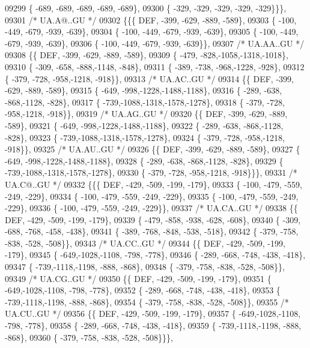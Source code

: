 \begin{DoxyCode}
09299 \{ -689, -689, -689, -689, -689\},
09300 \{ -329, -329, -329, -329, -329\}\}\},
09301 \textcolor{comment}{/* UA.A@..GU */}
09302 \{\{\{  DEF, -399, -629, -889, -589\},
09303 \{ -100, -449, -679, -939, -639\},
09304 \{ -100, -449, -679, -939, -639\},
09305 \{ -100, -449, -679, -939, -639\},
09306 \{ -100, -449, -679, -939, -639\}\},
09307 \textcolor{comment}{/* UA.AA..GU */}
09308 \{\{  DEF, -399, -629, -889, -589\},
09309 \{ -479, -828,-1058,-1318,-1018\},
09310 \{ -309, -658, -888,-1148, -848\},
09311 \{ -389, -738, -968,-1228, -928\},
09312 \{ -379, -728, -958,-1218, -918\}\},
09313 \textcolor{comment}{/* UA.AC..GU */}
09314 \{\{  DEF, -399, -629, -889, -589\},
09315 \{ -649, -998,-1228,-1488,-1188\},
09316 \{ -289, -638, -868,-1128, -828\},
09317 \{ -739,-1088,-1318,-1578,-1278\},
09318 \{ -379, -728, -958,-1218, -918\}\},
09319 \textcolor{comment}{/* UA.AG..GU */}
09320 \{\{  DEF, -399, -629, -889, -589\},
09321 \{ -649, -998,-1228,-1488,-1188\},
09322 \{ -289, -638, -868,-1128, -828\},
09323 \{ -739,-1088,-1318,-1578,-1278\},
09324 \{ -379, -728, -958,-1218, -918\}\},
09325 \textcolor{comment}{/* UA.AU..GU */}
09326 \{\{  DEF, -399, -629, -889, -589\},
09327 \{ -649, -998,-1228,-1488,-1188\},
09328 \{ -289, -638, -868,-1128, -828\},
09329 \{ -739,-1088,-1318,-1578,-1278\},
09330 \{ -379, -728, -958,-1218, -918\}\}\},
09331 \textcolor{comment}{/* UA.C@..GU */}
09332 \{\{\{  DEF, -429, -509, -199, -179\},
09333 \{ -100, -479, -559, -249, -229\},
09334 \{ -100, -479, -559, -249, -229\},
09335 \{ -100, -479, -559, -249, -229\},
09336 \{ -100, -479, -559, -249, -229\}\},
09337 \textcolor{comment}{/* UA.CA..GU */}
09338 \{\{  DEF, -429, -509, -199, -179\},
09339 \{ -479, -858, -938, -628, -608\},
09340 \{ -309, -688, -768, -458, -438\},
09341 \{ -389, -768, -848, -538, -518\},
09342 \{ -379, -758, -838, -528, -508\}\},
09343 \textcolor{comment}{/* UA.CC..GU */}
09344 \{\{  DEF, -429, -509, -199, -179\},
09345 \{ -649,-1028,-1108, -798, -778\},
09346 \{ -289, -668, -748, -438, -418\},
09347 \{ -739,-1118,-1198, -888, -868\},
09348 \{ -379, -758, -838, -528, -508\}\},
09349 \textcolor{comment}{/* UA.CG..GU */}
09350 \{\{  DEF, -429, -509, -199, -179\},
09351 \{ -649,-1028,-1108, -798, -778\},
09352 \{ -289, -668, -748, -438, -418\},
09353 \{ -739,-1118,-1198, -888, -868\},
09354 \{ -379, -758, -838, -528, -508\}\},
09355 \textcolor{comment}{/* UA.CU..GU */}
09356 \{\{  DEF, -429, -509, -199, -179\},
09357 \{ -649,-1028,-1108, -798, -778\},
09358 \{ -289, -668, -748, -438, -418\},
09359 \{ -739,-1118,-1198, -888, -868\},
09360 \{ -379, -758, -838, -528, -508\}\}\},

\end{DoxyCode}
